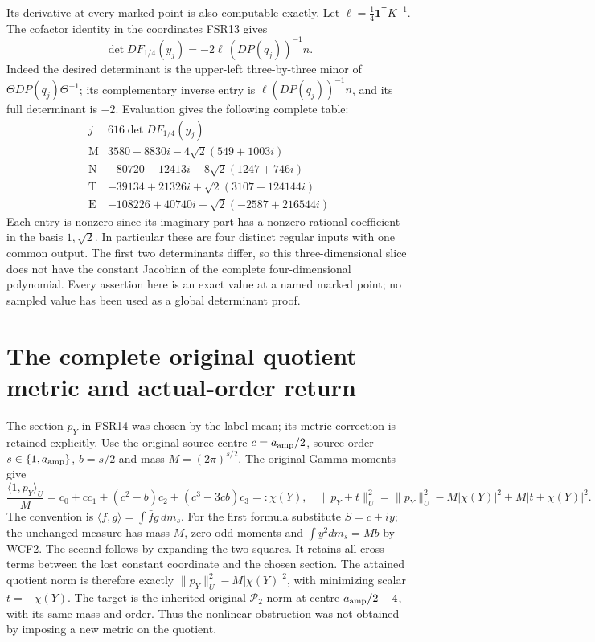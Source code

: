 Its derivative at every marked point is also computable exactly.
Let $\ell=\tfrac14\mathbf1^{\mathsf T}K^{-1}$. The cofactor
identity in the coordinates FSR13 gives
\[
 \det DF_{1/4}(y_j)=-2\ell\,(DP(q_j))^{-1}n.
 \tag{FSR18}
\]
Indeed the desired determinant is the upper-left three-by-three
minor of $\Theta DP(q_j)\Theta^{-1}$; its complementary inverse
entry is $\ell(DP(q_j))^{-1}n$, and its full determinant is $-2$.
Evaluation gives the following complete table:
\[
\begin{array}{c|l}
 j&616\det DF_{1/4}(y_j)\\\hline
 \mathrm M&3580+8830i-4\sqrt2(549+1003i)\\
 \mathrm N&-80720-12413i-8\sqrt2(1247+746i)\\
 \mathrm T&-39134+21326i+\sqrt2(3107-124144i)\\
 \mathrm E&-108226+40740i+\sqrt2(-2587+216544i)
\end{array}\tag{FSR19}
\]
Each entry is nonzero since its imaginary part has a nonzero rational
coefficient in the basis $1,\sqrt2$. In particular these are four
distinct regular inputs with one common output. The first two
determinants differ, so this three-dimensional slice does not have
the constant Jacobian of the complete four-dimensional polynomial.
Every assertion here is an exact value at a named marked point;
no sampled value has been used as a global determinant proof.

\section{The complete original quotient metric and actual-order return}
The section $p_Y$ in FSR14 was chosen by the label mean; its metric
correction is retained explicitly. Use the original source centre
$c=a_{\rm amp}/2$, source order $s\in\{1,a_{\rm amp}\}$,
$b=s/2$ and mass $M=(2\pi)^{s/2}$. The original Gamma moments give
\[
 \frac{\langle1,p_Y\rangle_U}{M}
  =c_0+cc_1+(c^2-b)c_2+(c^3-3cb)c_3=:\chi(Y),
 \quad
 \|p_Y+t\|_U^2=
 \|p_Y\|_U^2-M|\chi(Y)|^2+M|t+\chi(Y)|^2.
 \tag{FSR20}
\]
The convention is $\langle f,g\rangle=\int\bar f g\,dm_s$.
For the first formula substitute $S=c+iy$; the unchanged measure
has mass $M$, zero odd moments and $\int y^2dm_s=Mb$ by WCF2.
The second follows by expanding the two squares. It retains all
cross terms between the lost constant coordinate and the chosen
section. The attained quotient norm is therefore exactly
$\|p_Y\|_U^2-M|\chi(Y)|^2$, with minimizing scalar $t=-\chi(Y)$.
The target is the inherited original $\mathcal P_2$ norm at centre
$a_{\rm amp}/2-4$, with its same mass and order. Thus the nonlinear
obstruction was not obtained by imposing a new metric on the quotient.

